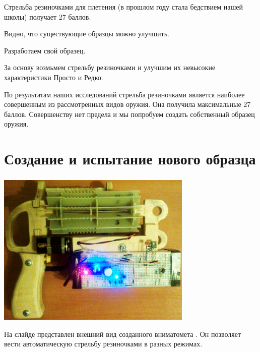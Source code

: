 Стрельба резиночками для плетения (в прошлом году стала бедствием нашей школы) получает 27 баллов.

\begin{frame}
    \begin{center}
        Видно, что существующие образцы можно улучшить. 
        
        \par\bigskip
        
        Разработаем свой образец.
        
        \par\bigskip

        За основу возмьмем стрельбу резиночками и улучшим их невысокие характеристики \alert{Просто} и \alert{Редко}.
    \end{center}
\end{frame}

По результатам наших исследований стрельба резиночками является наиболее совершенным из рассмотренных видов оружия. Она получила максимальные 27 баллов. Совершенству нет предела и мы попробуем создать собственный образец оружия.
\par\bigskip

\section{Создание и испытание нового образца}

\begin{frame}
    \frametitle{\myDevice}
    
    \begin{center}
        \includegraphics[width=0.7\textwidth]{fig/device}
    \end{center}
\end{frame}

На слайде представлен внешний вид созданного вниматомета {\myDevice}. Он позволяет вести автоматическую стрельбу резиночками в разных режимах.

